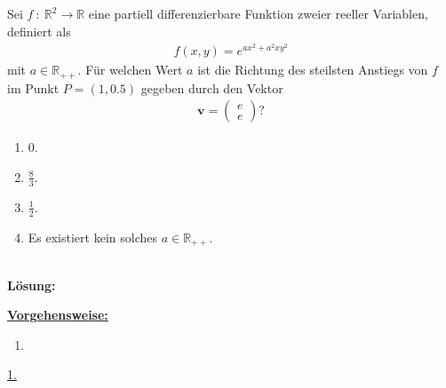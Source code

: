  
\newpage

\subsection*{}
Sei $ f \ : \ \mathbb{R}^2 \to \mathbb{R} $ eine partiell differenzierbare Funktion zweier reeller Variablen, definiert als 
\begin{align*}
	f(x,y) = e^{ax^2 +a^2 xy^2}
\end{align*}
mit $ a \in \mathbb{R}_{++} $. Für welchen Wert $ a $ ist die Richtung des steilsten Anstiegs von $ f $ im Punkt $ P = (1,0.5) $ gegeben durch den Vektor
\begin{align*}
	\textbf{v} =
	\begin{pmatrix}
		e\\
		e
	\end{pmatrix}?
\end{align*}
\renewcommand{\labelenumi}{(\alph{enumi})}
\begin{enumerate}
	\item 
	$0 $.
	\item
	$\frac{8}{3}$.
	\item
	$\frac{1}{2}$.
	\item
	Es existiert kein solches $ a \in \mathbb{R}_{++} $.
\end{enumerate}
\ \\
\textbf{Lösung:}
\begin{mdframed}
\underline{\textbf{Vorgehensweise:}}
\renewcommand{\labelenumi}{\theenumi.}
\begin{enumerate}
\item 
\end{enumerate}
\end{mdframed}

\underline{1. }\\


\newpage
